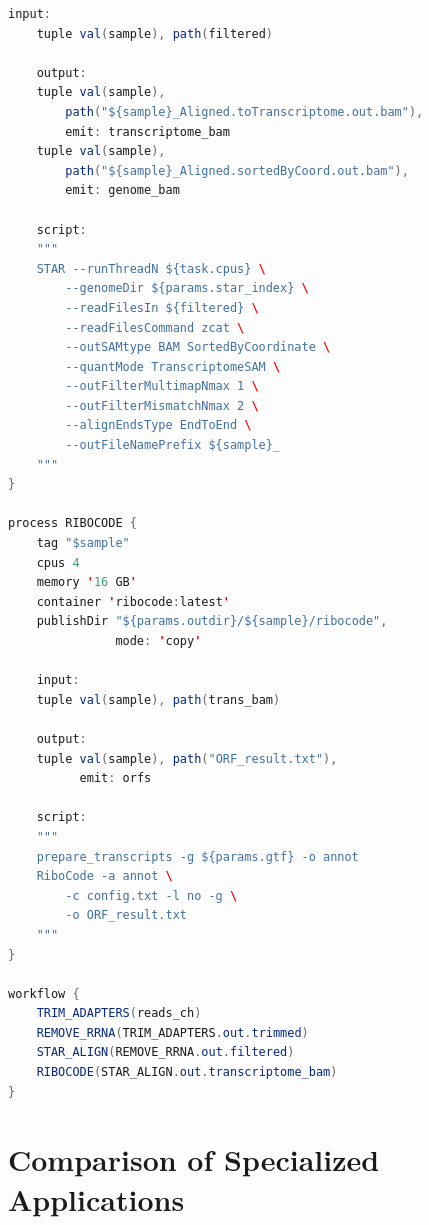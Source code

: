 \begin{lstlisting}[language=Java, caption={Nextflow workflow for Ribo-seq analysis.}, label={lst:specialized:riboseq-nextflow}]
    input:
    tuple val(sample), path(filtered)

    output:
    tuple val(sample),
        path("${sample}_Aligned.toTranscriptome.out.bam"),
        emit: transcriptome_bam
    tuple val(sample),
        path("${sample}_Aligned.sortedByCoord.out.bam"),
        emit: genome_bam

    script:
    """
    STAR --runThreadN ${task.cpus} \
        --genomeDir ${params.star_index} \
        --readFilesIn ${filtered} \
        --readFilesCommand zcat \
        --outSAMtype BAM SortedByCoordinate \
        --quantMode TranscriptomeSAM \
        --outFilterMultimapNmax 1 \
        --outFilterMismatchNmax 2 \
        --alignEndsType EndToEnd \
        --outFileNamePrefix ${sample}_
    """
}

process RIBOCODE {
    tag "$sample"
    cpus 4
    memory '16 GB'
    container 'ribocode:latest'
    publishDir "${params.outdir}/${sample}/ribocode",
               mode: 'copy'

    input:
    tuple val(sample), path(trans_bam)

    output:
    tuple val(sample), path("ORF_result.txt"),
          emit: orfs

    script:
    """
    prepare_transcripts -g ${params.gtf} -o annot
    RiboCode -a annot \
        -c config.txt -l no -g \
        -o ORF_result.txt
    """
}

workflow {
    TRIM_ADAPTERS(reads_ch)
    REMOVE_RRNA(TRIM_ADAPTERS.out.trimmed)
    STAR_ALIGN(REMOVE_RRNA.out.filtered)
    RIBOCODE(STAR_ALIGN.out.transcriptome_bam)
}
\end{lstlisting}


\section{Comparison of Specialized Applications}
\label{sec:specialized:comparison-table}

